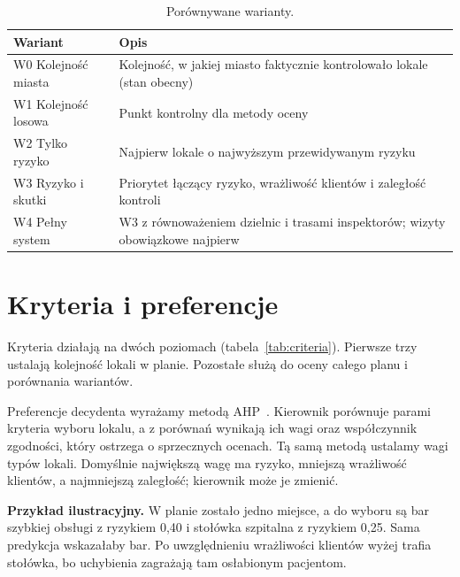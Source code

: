 \documentclass[11pt,a4paper]{article}
\begin{document}
\begin{table}[H]
\centering\small
\caption{Porównywane warianty.}
\label{tab:variants}
\begin{tabularx}{\textwidth}{@{}L{4.2cm}Y@{}}
\toprule
Wariant & Opis \\
\midrule
W0 Kolejność miasta & Kolejność, w jakiej miasto faktycznie kontrolowało lokale (stan
  obecny) \\
W1 Kolejność losowa & Punkt kontrolny dla metody oceny \\
W2 Tylko ryzyko & Najpierw lokale o najwyższym przewidywanym ryzyku \\
W3 Ryzyko i skutki & Priorytet łączący ryzyko, wrażliwość klientów i zaległość kontroli \\
W4 Pełny system & W3 z równoważeniem dzielnic i trasami inspektorów; wizyty obowiązkowe
  najpierw \\
\bottomrule
\end{tabularx}
\end{table}

\section{Kryteria i preferencje}

Kryteria działają na dwóch poziomach (tabela~\ref{tab:criteria}). Pierwsze trzy ustalają
kolejność lokali w planie. Pozostałe służą do oceny całego planu i porównania wariantów.

Preferencje decydenta wyrażamy metodą AHP~\cite{saaty}. Kierownik porównuje parami kryteria
wyboru lokalu, a z porównań wynikają ich wagi oraz współczynnik zgodności, który ostrzega
o sprzecznych ocenach. Tą samą metodą ustalamy wagi typów lokali. Domyślnie największą wagę ma
ryzyko, mniejszą wrażliwość klientów, a najmniejszą zaległość; kierownik może je zmienić.

\textbf{Przykład ilustracyjny.} W planie zostało jedno miejsce, a do wyboru są bar szybkiej
obsługi z ryzykiem 0,40 i stołówka szpitalna z ryzykiem 0,25. Sama predykcja wskazałaby bar.
Po uwzględnieniu wrażliwości klientów wyżej trafia stołówka, bo uchybienia zagrażają tam
osłabionym pacjentom.
\end{document}
